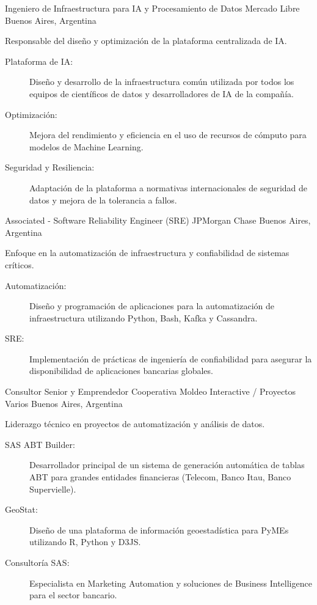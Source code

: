 \documentclass[9pt,a4paper,sans]{moderncv}
\begin{document}
	{Ingeniero de Infraestructura para IA y Procesamiento de Datos}
	{Mercado Libre}
	{Buenos Aires, Argentina}
	{}
	{Responsable del diseño y optimización de la plataforma centralizada de IA.
	\begin{description}
		\item[Plataforma de IA:] Diseño y desarrollo de la infraestructura común utilizada por todos los equipos de científicos de datos y desarrolladores de IA de la compañía.
		\item[Optimización:] Mejora del rendimiento y eficiencia en el uso de recursos de cómputo para modelos de Machine Learning.
		\item[Seguridad y Resiliencia:] Adaptación de la plataforma a normativas internacionales de seguridad de datos y mejora de la tolerancia a fallos.
	\end{description}}

	{Associated - Software Reliability Engineer (SRE)}
	{JPMorgan Chase}
	{Buenos Aires, Argentina}
	{}
	{Enfoque en la automatización de infraestructura y confiabilidad de sistemas críticos.
	\begin{description}
		\item[Automatización:] Diseño y programación de aplicaciones para la automatización de infraestructura utilizando Python, Bash, Kafka y Cassandra.
		\item[SRE:] Implementación de prácticas de ingeniería de confiabilidad para asegurar la disponibilidad de aplicaciones bancarias globales.
	\end{description}}

	{Consultor Senior y Emprendedor}
	{Cooperativa Moldeo Interactive / Proyectos Varios}
	{Buenos Aires, Argentina}
	{}
	{Liderazgo técnico en proyectos de automatización y análisis de datos.
	\begin{description}
		\item[SAS ABT Builder:] Desarrollador principal de un sistema de generación automática de tablas ABT para grandes entidades financieras (Telecom, Banco Itau, Banco Supervielle).
		\item[GeoStat:] Diseño de una plataforma de información geoestadística para PyMEs utilizando R, Python y D3JS.
		\item[Consultoría SAS:] Especialista en Marketing Automation y soluciones de Business Intelligence para el sector bancario.
	\end{description}}
\end{document}
